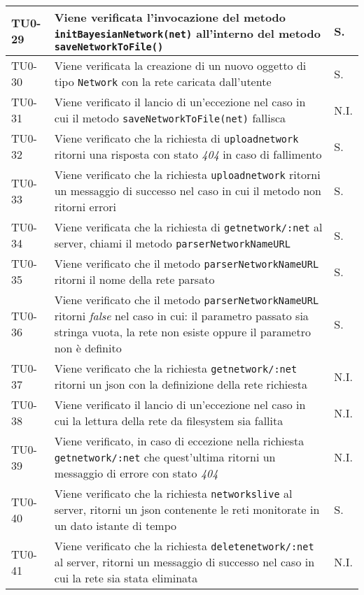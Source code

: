 \begin{longtable}{|C{.15\textwidth}|m{.66\textwidth}|C{.10\textwidth}|}
\hline 
{}TU0-29 & Viene verificata l'invocazione del metodo \texttt{initBayesianNetwork(net)} all'interno del metodo \texttt{saveNetworkToFile()} & S. \\ 
\hline 
TU0-30 & Viene verificata la creazione di un nuovo oggetto di tipo \texttt{Network} con la rete caricata dall'utente & S. \\ 
\hline
{} TU0-31 & Viene verificato il lancio di un'eccezione nel caso in cui il metodo \texttt{saveNetworkToFile(net)} fallisca & N.I. \\
\hline
TU0-32 & Viene verificato che la richiesta di \texttt{uploadnetwork} ritorni una risposta con stato \textit{404} in caso di fallimento & S. \\ 
\hline
{} TU0-33 & Viene verificato che la richiesta \texttt{uploadnetwork} ritorni un messaggio di successo nel caso in cui il metodo non ritorni errori & S. \\
\hline
TU0-34 & Viene verificata che la richiesta di \texttt{getnetwork/:net} al server, chiami il metodo \texttt{parserNetworkNameURL} & S. \\ 
\hline
{} TU0-35 & Viene verificato che il metodo \texttt{parserNetworkNameURL} ritorni il nome della rete parsato & S. \\ 
\hline 
TU0-36 & Viene verificato che il metodo \texttt{parserNetworkNameURL} ritorni \textit{false} nel caso in cui: il parametro passato sia stringa vuota, la rete non esiste oppure il parametro non è definito & S. \\ 
\hline 
{}TU0-37 & Viene verificato che la richiesta \texttt{getnetwork/:net} ritorni un json con la definizione della rete richiesta & N.I. \\ 
\hline 
TU0-38 & Viene verificato il lancio di un'eccezione nel caso in cui la lettura della rete da filesystem sia fallita & N.I. \\
\hline
  TU0-39 & Viene verificato, in caso di eccezione nella richiesta \texttt{getnetwork/:net} che quest'ultima ritorni un messaggio di errore con stato \textit{404} & N.I. \\ 
 \hline
TU0-40 & Viene verificato che la richiesta \texttt{networkslive} al server, ritorni un json contenente le reti monitorate in un dato istante di tempo & S. \\ 
 \hline 
 TU0-41 & Viene verificato che la richiesta \texttt{deletenetwork/:net} al server, ritorni un messaggio di successo nel caso in cui la rete sia stata eliminata & N.I. \\

\end{longtable}
